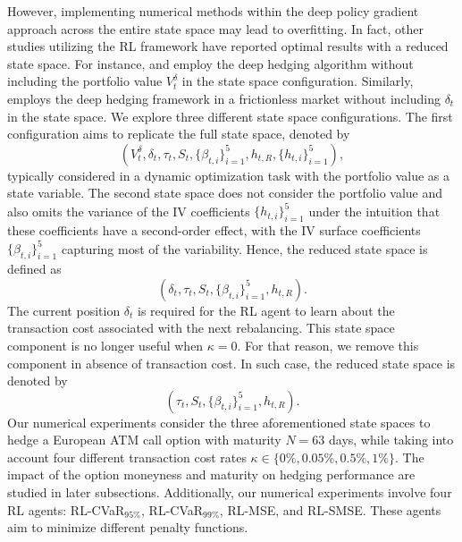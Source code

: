 \documentclass[12pt]{article}
\begin{document}
However, implementing numerical methods within the deep policy gradient approach across the entire state space may lead to overfitting. In fact, other studies utilizing the RL framework have reported optimal results with a reduced state space. For instance, \cite{buehler2019deep} and \cite{cao2023gamma} employ the deep hedging algorithm without including the portfolio value $V_{t}^{\delta}$ in the state space configuration. 
Similarly, \cite{carbonneau2021deep} employs the deep hedging framework in a frictionless market without including $\delta_{t}$ in the state space.
We explore three different state space configurations. The first configuration aims to replicate the full state space, denoted by 
\begin{equation}
    (V_{t}^{\delta},\delta_{t},\tau_{t},S_{t},\{\beta_{t,i} \}^5_{i=1}, h_{t,R}, \{ h_{t,i}\}^5_{i=1}), 
\end{equation}
typically considered in a dynamic optimization task with the portfolio value as a state variable. The second state space does not consider the portfolio value and also omits the variance of the IV coefficients $\{ h_{t,i}\}^5_{i=1}$ under the intuition that these coefficients have a second-order effect, with the IV surface coefficients $\{\beta_{t,i} \}^5_{i=1}$ capturing most of the variability. Hence, the reduced state space is defined as
\begin{equation*}
    (\delta_{t},\tau_{t},S_{t},\{\beta_{t,i} \}^5_{i=1}, h_{t,R}). %
\end{equation*}
The current position $\delta_t$ is required for the RL agent to learn about the transaction cost associated with the next rebalancing.  This state space component is no longer useful when $\kappa=0$.  For that reason, we remove this component in absence of transaction cost. In such case, the reduced state space is denoted by 
\begin{equation*}
    (\tau_{t},S_{t},\{\beta_{t,i} \}^5_{i=1}, h_{t,R}). %
\end{equation*}
Our numerical experiments consider the three aforementioned state spaces  to hedge a European ATM call option with maturity $N=63$ days, while taking into account four different transaction cost rates $\kappa \in \{ 0\%, 0.05\%, 0.5\%, 1\% \}$. The impact of the option moneyness and maturity on hedging performance are studied in later subsections. Additionally, our numerical experiments involve four RL agents: RL-CVaR$_{95\%}$, RL-CVaR$_{99\%}$, RL-MSE, and RL-SMSE. These agents aim to minimize different penalty functions.
\end{document}
